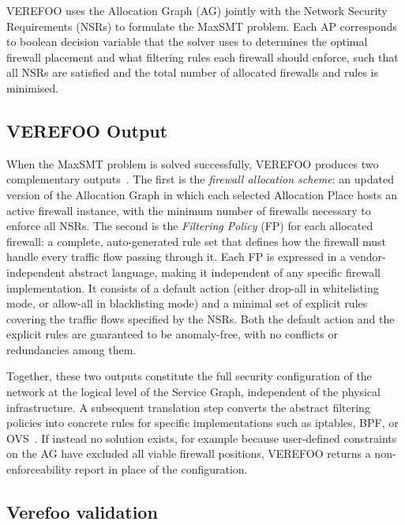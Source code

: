 VEREFOO uses the Allocation Graph (AG) jointly with the Network Security Requirements (NSRs) to formulate the MaxSMT problem. Each AP corresponds to boolean decision variable that the solver uses to determines the optimal firewall placement and what filtering rules each firewall should enforce, such that all NSRs are satisfied and the total number of allocated firewalls and rules is minimised.



\subsection{VEREFOO Output}

When the MaxSMT problem is solved successfully, VEREFOO produces two complementary outputs~\cite{verefoo}. The first is the \textit{firewall allocation scheme}: an updated version of the Allocation Graph in which each selected Allocation Place hosts an active firewall instance, with the minimum number of firewalls necessary to enforce all NSRs. The second is the \textit{Filtering Policy} (FP) for each allocated firewall: a complete, auto-generated rule set that defines how the firewall must handle every traffic flow passing through it. Each FP is expressed in a vendor-independent abstract language, making it independent of any specific firewall implementation. It consists of a default action (either drop-all in whitelisting mode, or allow-all in blacklisting mode) and a minimal set of explicit rules covering the traffic flows specified by the NSRs. Both the default action and the explicit rules are guaranteed to be anomaly-free, with no conflicts or redundancies among them.

Together, these two outputs constitute the full security configuration of the network at the logical level of the Service Graph, independent of the physical infrastructure. A subsequent translation step converts the abstract filtering policies into concrete rules for specific implementations such as iptables, BPF, or OVS~\cite{verefoo}. If instead no solution exists, for example because user-defined constraints on the AG have excluded all viable firewall positions, VEREFOO returns a non-enforceability report in place of the configuration.


\subsection{Verefoo validation}

